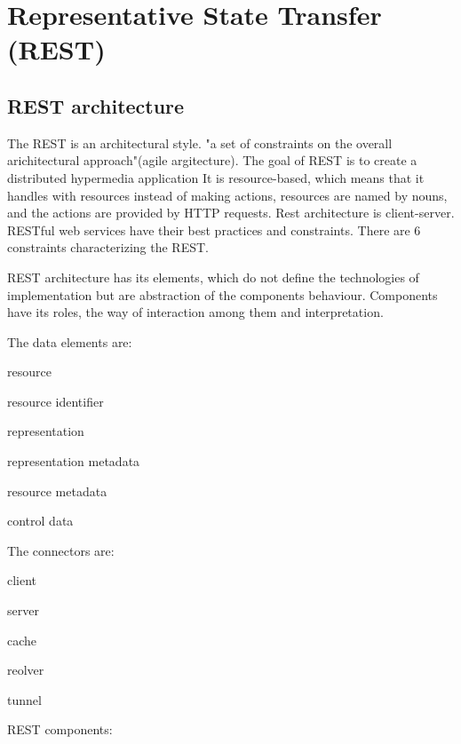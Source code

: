 \chapter{Representative State Transfer (REST)}
\label{chap:rest}


\section{REST architecture}
\label{sec:rest-architecture}

The REST is an architectural style. "a set of constraints on the overall arichitectural approach"(agile argitecture). The goal of REST is to create a distributed hypermedia application It is resource-based, which means that it handles with resources instead of making actions, resources are named by nouns, and the actions are provided by HTTP requests. Rest architecture is client-server.
RESTful web services have their best practices and constraints. There are 6 constraints characterizing the REST. 

REST architecture has its elements, which do not define the technologies of implementation but are abstraction of the components behaviour. Components have its roles, the way of interaction among them and interpretation.

The data elements are:

\begin{description}
  \item resource
  \item resource identifier
  \item representation
  \item representation metadata
  \item resource metadata
  \item control data
\end{description}

The connectors are:

\begin{description}
  \item client
  \item server
  \item cache
  \item reolver
  \item tunnel 
\end{description}

REST components:


